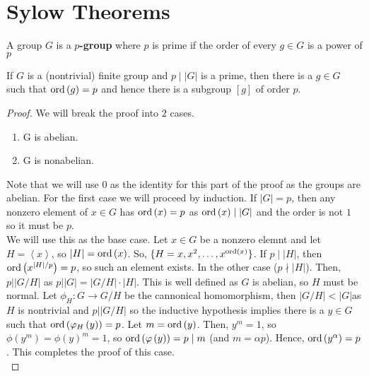 \section{Sylow Theorems}
\begin{definition}[P-groups]
	A group \(G\) is a \textbf{\(p\)-group} where \(p\) is prime if the order of every \(g \in G\) is a power of \(p\)
\end{definition}
\begin{theorem}
	If \(G\) is a (nontrivial) finite group and \(p \mid \left| G \right| \) is a prime, then there is a \(g \in G\) such that \(\operatorname{ord} \left( g \right) = p \) and hence there is a subgroup \(\left[ g \right] \) of order \(p\).
\end{theorem}
\begin{proof}
	We will break the proof into \(2\) cases.
	\begin{enumerate}
		\item G is abelian.
		\item G is nonabelian.
	\end{enumerate}
	Note that we will use \(0\) as the identity for this part of the proof as the groups are abelian. For the first case we will proceed by induction. If \(\left| G \right| = p\), then any nonzero element of \(x \in G\) has \(\operatorname{ord} \left( x \right) = p\) as \(\operatorname{ord} \left( x \right) \mid \left| G \right| \) and the order is not \(1\) so it must be \(p\).\\
	We will use this as the base case.  Let \(x \in G\) be a nonzero elemnt and let \(H = \left<x \right> \), so \(\left| H \right| = \operatorname{ord} \left( x \right) \). So, \(\{H = x, x^2, \ldots, x^{\operatorname{ord} \left( x \right) }\}\). If \(p \mid \left| H \right| \), then \(\operatorname{ord} \left( x^{\left| H \right| / p} \right) = p \), so such an element exists. In the other case (\(p \nmid \left| H \right| \)). Then, \(p | \left| G / H \right| \) as \(p | \left| G \right| = \left| G / H \right| \cdot \left| H \right| \). This is well defined as \(G\) is abelian, so \(H\) must be normal. Let \(\phi _{H}: G \to G /H\) be the cannonical homomorphism, then \(\left| G / H \right| < \left| G \right| \)as \(H\) is nontrivial and \(p | \left| G / H \right| \) so the inductive hypothesis implies there is a \(y \in G\) such that \(\operatorname{ord} \left( \varphi _{H} \left( y \right)  \right)  = p\). Let \(m = \operatorname{ord} \left( y \right) \). Then, \(y^{m} = 1\), so \(\phi \left( y^{m} \right) = \phi \left( y \right) ^{m} = 1\), so \(\operatorname{ord} \left( \varphi\left( y \right)  \right)  = p \mid m\) (and \(m = \alpha p\)). Hence, \(\operatorname{ord} \left( y^{\alpha} \right) = p \). This completes the proof of this case.\\

\end{proof}
